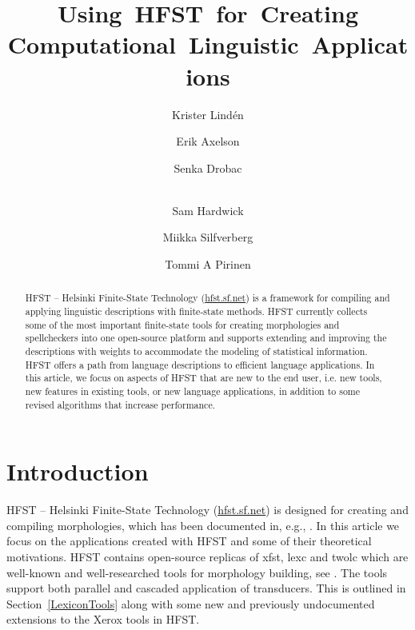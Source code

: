 \documentclass{llncs}
\begin{document}
%
\title{Using~HFST~for~Creating Computational~Linguistic~Applications}
%
\author{Krister Lind\'{e}n \and Erik Axelson \and Senka Drobac \and\\
  Sam Hardwick \and Miikka Silfverberg \and Tommi A Pirinen }


\maketitle

\begin{abstract}
  \sloppy HFST – Helsinki Finite-State Technology (\url{hfst.sf.net})
  is a framework for compiling and applying linguistic descriptions
  with finite-state methods. HFST currently collects some of the most 
  important finite-state tools for creating morphologies and spellcheckers into 
  one open-source platform and supports extending and improving 
  the descriptions with weights to accommodate the modeling of 
  statistical information. HFST offers a path from language descriptions 
  to efficient language applications. In this article, we focus 
  on aspects of HFST that are new to the end user, i.e. new tools, new features in
  existing tools, or new language applications, in addition to some revised algorithms 
  that increase performance.

\end{abstract}

\section{Introduction}

HFST – Helsinki Finite-State Technology (\url{hfst.sf.net}) is designed 
for creating and compiling morphologies, which has been documented in, e.g.,  
\cite{linden/2009/sfcm,linden/2011/sfcm}. In this article we focus on the applications 
created with HFST and some of their theoretical motivations. HFST
contains open-source replicas of xfst, lexc and twolc which are
well-known and well-researched tools for morphology building, see \cite{beesley/2003}. The tools
support both parallel and cascaded application of transducers. 
This is outlined in Section~\ref{LexiconTools} along with some new and 
previously undocumented extensions to the Xerox tools in HFST.  
\end{document}
